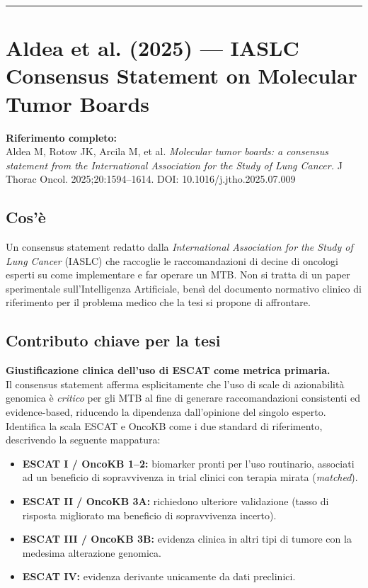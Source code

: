 \documentclass[12pt, a4paper]{article}
\begin{document}
\vspace{1em}
\hrule
\vspace{1em}

\section{Aldea et al. (2025) --- IASLC Consensus Statement on Molecular Tumor Boards}

\textbf{Riferimento completo:}\\
Aldea M, Rotow JK, Arcila M, et al. \textit{Molecular tumor boards: a consensus statement from the International Association for the Study of Lung Cancer.} J Thorac Oncol. 2025;20:1594--1614. DOI: 10.1016/j.jtho.2025.07.009

\subsection{Cos'è}
Un consensus statement redatto dalla \textit{International Association for the Study of Lung Cancer} (IASLC) che raccoglie le raccomandazioni di decine di oncologi esperti su come implementare e far operare un MTB. Non si tratta di un paper sperimentale sull'Intelligenza Artificiale, bensì del documento normativo clinico di riferimento per il problema medico che la tesi si propone di affrontare.

\subsection{Contributo chiave per la tesi}
\textbf{Giustificazione clinica dell'uso di ESCAT come metrica primaria.}\\
Il consensus statement afferma esplicitamente che l'uso di scale di azionabilità genomica è \textit{critico} per gli MTB al fine di generare raccomandazioni consistenti ed evidence-based, riducendo la dipendenza dall'opinione del singolo esperto. Identifica la scala ESCAT e OncoKB come i due standard di riferimento, descrivendo la seguente mappatura:
\begin{itemize}[leftmargin=1.8em, itemsep=2pt]
  \item \textbf{ESCAT I / OncoKB 1--2:} biomarker pronti per l'uso routinario, associati ad un beneficio di sopravvivenza in trial clinici con terapia mirata (\textit{matched}).
  \item \textbf{ESCAT II / OncoKB 3A:} richiedono ulteriore validazione (tasso di risposta migliorato ma beneficio di sopravvivenza incerto).
  \item \textbf{ESCAT III / OncoKB 3B:} evidenza clinica in altri tipi di tumore con la medesima alterazione genomica.
  \item \textbf{ESCAT IV:} evidenza derivante unicamente da dati preclinici.
\end{itemize}
\end{document}
